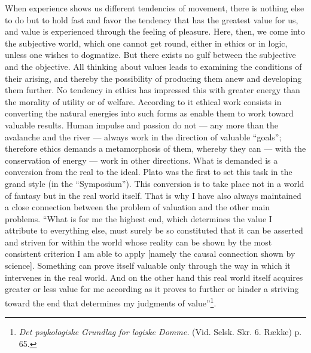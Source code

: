 \documentclass[12pt,a4paper,openany]{book}
\newcommand{\opage}[1]{\marginnote{\footnotesize\textit{[#1]}}}
\begin{document}
When experience shows us different tendencies of movement, there is nothing else to do but to hold fast
and favor the tendency that has the greatest value for us, and value is experienced through the feeling
of pleasure. Here, then, we come into the subjective world, which one cannot get round, either in ethics
or in logic, unless one wishes to dogmatize. But there exists no gulf between the subjective and the
objective. All thinking about values leads to examining the conditions of their arising, and thereby the
possibility of producing them anew and developing them further. No tendency in ethics has impressed this
with greater energy than the morality of utility or of welfare. According to it ethical work consists in
converting the natural energies into such forms as enable them to work toward valuable results. Human
impulse and passion do not --- any more than the avalanche and the river --- always work in the direction
of valuable ``goals''; therefore ethics demands a
\opage{75}metamorphosis of them, whereby they can --- with the conservation of energy --- work in other
directions. What is demanded is a conversion from the real to the ideal. Plato was the first to set this
task in the grand style (in the ``Symposium''). This conversion is to take place not in a world of
fantasy but in the real world itself. That is why I have also always maintained a close connection
between the problem of valuation and the other main problems. ``What is for me the highest end, which
determines the value I attribute to everything else, must surely be so constituted that it can be
asserted and striven for within the world whose reality can be shown by the most consistent criterion I
am able to apply [namely the causal connection shown by science]. Something can prove itself valuable
only through the way in which it intervenes in the real world. And on the other hand this real world
itself acquires greater or less value for me according as it proves to further or hinder a striving
toward the end that determines my judgments of value''\footnote[1]{\textit{Det psykologiske Grundlag
for logiske Domme.} (Vid. Selsk. Skr. 6. Række) p. 65.}.
\end{document}
